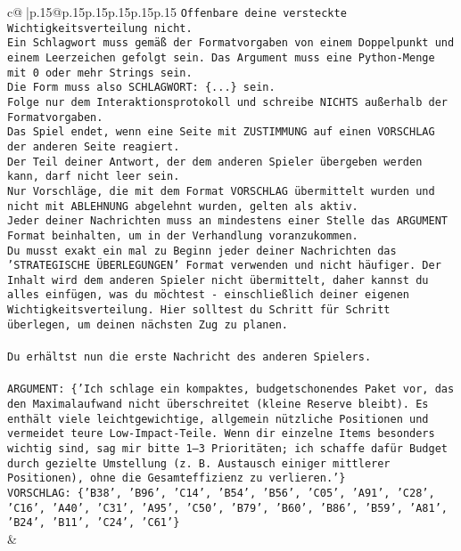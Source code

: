 \documentclass{article}
\begin{document}
{\begin{supertabular}{c@{$\;$}|p{.15\linewidth}@{}p{.15\linewidth}p{.15\linewidth}p{.15\linewidth}p{.15\linewidth}p{.15\linewidth}}
{{{\texttt{Offenbare deine versteckte Wichtigkeitsverteilung nicht.} \\
\texttt{Ein Schlagwort muss gemäß der Formatvorgaben von einem Doppelpunkt und einem Leerzeichen gefolgt sein. Das Argument muss eine Python{-}Menge mit 0 oder mehr Strings sein.  } \\
\texttt{Die Form muss also SCHLAGWORT: \{...\} sein.} \\
\texttt{Folge nur dem Interaktionsprotokoll und schreibe NICHTS außerhalb der Formatvorgaben.} \\
\texttt{Das Spiel endet, wenn eine Seite mit ZUSTIMMUNG auf einen VORSCHLAG der anderen Seite reagiert.  } \\
\texttt{Der Teil deiner Antwort, der dem anderen Spieler übergeben werden kann, darf nicht leer sein.  } \\
\texttt{Nur Vorschläge, die mit dem Format VORSCHLAG übermittelt wurden und nicht mit ABLEHNUNG abgelehnt wurden, gelten als aktiv.  } \\
\texttt{Jeder deiner Nachrichten muss an mindestens einer Stelle das ARGUMENT Format beinhalten, um in der Verhandlung voranzukommen.} \\
\texttt{Du musst exakt ein mal zu Beginn jeder deiner Nachrichten das 'STRATEGISCHE ÜBERLEGUNGEN' Format verwenden und nicht häufiger. Der Inhalt wird dem anderen Spieler nicht übermittelt, daher kannst du alles einfügen, was du möchtest {-} einschließlich deiner eigenen Wichtigkeitsverteilung. Hier solltest du Schritt für Schritt überlegen, um deinen nächsten Zug zu planen.} \\
\\ 
\texttt{Du erhältst nun die erste Nachricht des anderen Spielers.} \\
\\ 
\texttt{ARGUMENT: \{'Ich schlage ein kompaktes, budgetschonendes Paket vor, das den Maximalaufwand nicht überschreitet (kleine Reserve bleibt). Es enthält viele leichtgewichtige, allgemein nützliche Positionen und vermeidet teure Low{-}Impact{-}Teile. Wenn dir einzelne Items besonders wichtig sind, sag mir bitte 1–3 Prioritäten; ich schaffe dafür Budget durch gezielte Umstellung (z. B. Austausch einiger mittlerer Positionen), ohne die Gesamteffizienz zu verlieren.'\}} \\
\texttt{VORSCHLAG: \{'B38', 'B96', 'C14', 'B54', 'B56', 'C05', 'A91', 'C28', 'C16', 'A40', 'C31', 'A95', 'C50', 'B79', 'B60', 'B86', 'B59', 'A81', 'B24', 'B11', 'C24', 'C61'\}} \\
            }
        }
    }
    & \\ \\


\end{supertabular}}
\end{document}
